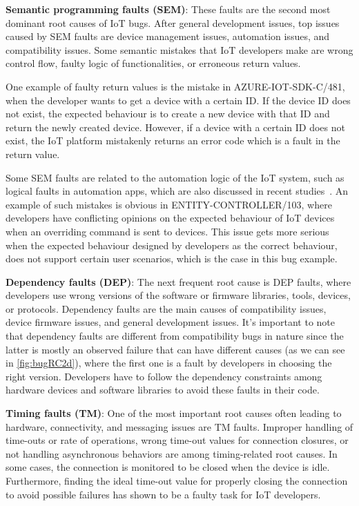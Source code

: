 \textbf{Semantic programming faults (SEM)}: These faults are the second most dominant root causes of IoT bugs. After general development issues, top issues caused by SEM faults are device management issues, automation issues, and compatibility issues. Some semantic mistakes that IoT developers make are wrong control flow, faulty logic of functionalities, or erroneous return values. 

One example of faulty return values is the mistake in AZURE-IOT-SDK-C/481, when the developer wants to get a device with a certain ID. If the device ID does not exist, the expected behaviour is to create a new device with that ID and return the newly created device. However, if a device with a certain ID does not exist, the IoT platform mistakenly returns an error code which is a fault in the return value.

Some SEM faults are related to the automation logic of the IoT system, such as logical faults in automation apps, which are also discussed in recent studies~\cite{ISSTA2020Interactions}.  An example of such mistakes is obvious in ENTITY-CONTROLLER/103, where developers have conflicting opinions on the expected behaviour of IoT devices when an overriding command is sent to devices. This issue gets more serious when the expected behaviour designed by developers as the correct behaviour, does not support certain user scenarios, which is the case in this bug example.

\textbf{Dependency faults (DEP)}: The next frequent root cause is DEP faults, where developers use wrong versions of the software or firmware libraries, tools, devices, or protocols. Dependency faults are the main causes of compatibility issues, device firmware issues, and general development issues. It's important to note that dependency faults are different from compatibility bugs in nature since the latter is mostly an observed failure that can have different causes (as we can see in \ref{fig:bugRC2d}), where the first one is a fault by developers in choosing the right version. Developers have to follow the dependency constraints among hardware devices and software libraries to avoid these faults in their code.

\textbf{Timing faults (TM)}: One of the most important root causes often leading to hardware, connectivity, and messaging issues are TM faults. Improper handling of time-outs or rate of operations, wrong time-out values for connection closures, or not handling asynchronous behaviors are among timing-related root causes. In some cases, the connection is monitored to be closed when the device is idle. Furthermore, finding the ideal time-out value for properly closing the connection to avoid possible failures has shown to be a faulty task for IoT developers.

